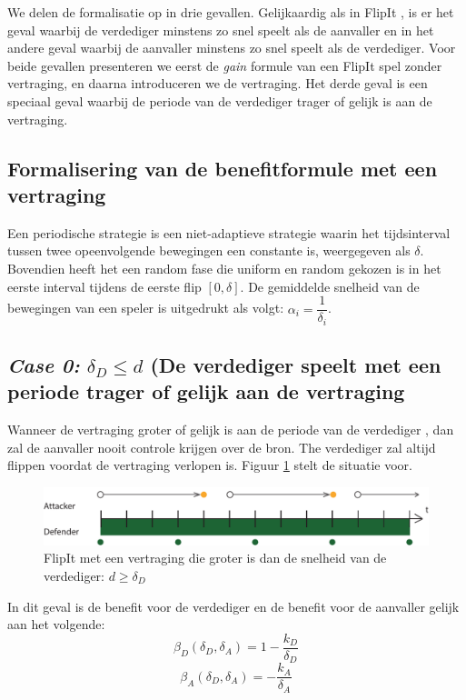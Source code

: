 \documentclass[master=cws, masteroption=vs,english]{kulemt}
\begin{document}
\begin{abstract*}
We delen de formalisatie op in drie gevallen. Gelijkaardig als in FlipIt \citep{FlipIt}, is er het geval waarbij de verdediger minstens zo snel speelt als de aanvaller en in het andere geval waarbij de aanvaller minstens zo snel speelt als de verdediger. Voor beide gevallen presenteren we eerst de \textit{gain} formule van een FlipIt spel zonder vertraging, en daarna introduceren we de vertraging. Het derde geval is een speciaal geval waarbij de periode van de verdediger trager of gelijk is aan de vertraging. 

\subsection{Formalisering van de benefitformule met een vertraging}
Een periodische strategie is een niet-adaptieve strategie waarin het tijdsinterval tussen twee opeenvolgende bewegingen een constante is, weergegeven als $\delta$. Bovendien heeft het een random fase die uniform en random gekozen is in het eerste interval tijdens de eerste flip $[0,\delta]$. De gemiddelde snelheid van de bewegingen van een speler is uitgedrukt als volgt: $\alpha_{i} = \dfrac{1}{\delta_{i}}$. 

\subsection*{\textit{Case 0:} $\delta_{D} \leq d$ (De verdediger speelt met een periode trager of gelijk aan de vertraging}

Wanneer de vertraging groter of gelijk is aan de periode van de verdediger , dan zal de aanvaller nooit controle krijgen over de bron. The verdediger zal altijd flippen voordat de vertraging verlopen is. Figuur \ref{langeredelaybegin} stelt de situatie voor. 

\begin{figure}[hbtp]
\centering
\includegraphics[scale=0.7]{Images/FlipItCase1delaytobig.pdf} 
\caption{FlipIt met een vertraging die groter is dan de snelheid van de verdediger: $ d \geq \delta_{D}$ }
\label{langeredelaybegin}
\end{figure}
In dit geval is de benefit voor de verdediger en de benefit voor de aanvaller gelijk aan het volgende:
\begin{equation}
\beta_{D}(\delta_{D},\delta_{A})=1-\dfrac{k_{D}}{\delta_{D}}
\end{equation}
\begin{equation}
\beta_{A}(\delta_{D},\delta_{A})=-\dfrac{k_{A}}{\delta_{A}}
\end{equation}


\end{abstract*}
\end{document}
